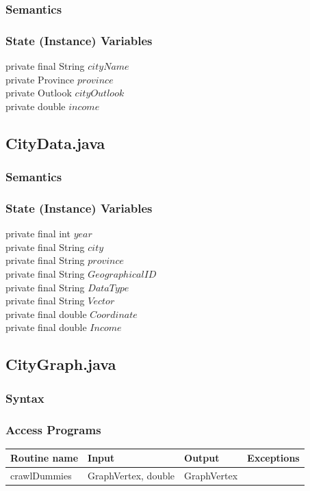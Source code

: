\documentclass[12pt,fleqn]{article}
\begin{document}
\subsubsection*{Semantics}
\subsubsection*{State (Instance) Variables}
	private final String $cityName$\\
	private Province $province$\\
	private Outlook $cityOutlook$\\
	private double $income$\\


\subsection*{CityData.java}\label{pcityd}

\subsubsection*{Semantics}
\subsubsection*{State (Instance) Variables}
	private final int $year$\\
	private final String $city$\\
	private final String $province$\\
	private final String $GeographicalID$\\
	private final String $DataType$\\
	private final String $Vector$\\
	private final double $Coordinate$\\
	private final double $Income$\\


\subsection*{CityGraph.java}\label{pgraph}
\subsubsection* {Syntax}

\subsubsection* {Access Programs}
\begin{tabular}{| l | l | l | l |}
\hline
\textbf{Routine name} & \textbf{Input} & \textbf{Output} & \textbf{Exceptions}\\
\hline
crawlDummies & GraphVertex, double & GraphVertex & ~\\
\hline
\end{tabular}
\end{document}
